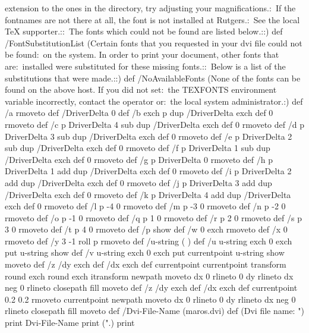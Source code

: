 extension to the ones in the directory, try adjusting your magnifications.:\
If the fontnames are not there at all, the font is not installed at Rutgers.:\
See the local TeX supporter.::\
The fonts which could not be found are listed below.::) def
/FontSubstitutionList (Certain fonts that you requested in your dvi file could not be found:\
on the system. In order to print your document, other fonts that are:\
installed were substituted for these missing fonts.::\
Below is a list of the substitutions that were made.::) def
/NoAvailableFonts (None of the fonts can be found on the above host. If you did not set:\
the TEXFONTS environment variable incorrectly, contact the operator or:\
the local system administrator.:) def
/a { rmoveto } def
/DriverDelta 0 def
/b { exch p dup /DriverDelta exch def 0 rmoveto } def
/c { p DriverDelta 4 sub dup /DriverDelta exch def 0 rmoveto } def
/d { p DriverDelta 3 sub dup /DriverDelta exch def 0 rmoveto } def
/e { p DriverDelta 2 sub dup /DriverDelta exch def 0 rmoveto } def
/f { p DriverDelta 1 sub dup /DriverDelta exch def 0 rmoveto } def
/g { p DriverDelta 0 rmoveto } def
/h { p DriverDelta 1 add dup /DriverDelta exch def 0 rmoveto } def
/i { p DriverDelta 2 add dup /DriverDelta exch def 0 rmoveto } def
/j { p DriverDelta 3 add dup /DriverDelta exch def 0 rmoveto } def
/k { p DriverDelta 4 add dup /DriverDelta exch def 0 rmoveto } def
/l { p -4 0 rmoveto } def
/m { p -3 0 rmoveto } def
/n { p -2 0 rmoveto } def
/o { p -1 0 rmoveto } def
/q { p 1 0 rmoveto } def
/r { p 2 0 rmoveto } def
/s { p 3 0 rmoveto } def
/t { p 4 0 rmoveto } def
/p { show } def
/w { 0 exch rmoveto } def
/x { 0 rmoveto } def
/y { 3 -1 roll p rmoveto } def
/u-string ( ) def
/u { u-string exch 0 exch put
u-string show
} def
/v { u-string exch 0 exch put
currentpoint
u-string show
moveto
} def
/z
{   /dy exch def
/dx exch def
currentpoint
currentpoint
transform round exch round exch itransform
newpath
moveto
dx 0 rlineto
0 dy rlineto
dx neg 0 rlineto
closepath
fill
moveto
}
def
/z
{   /dy exch def
/dx exch def
currentpoint
0.2 0.2 rmoveto
currentpoint
newpath
moveto
dx 0 rlineto
0 dy rlineto
dx neg 0 rlineto
closepath
fill
moveto
}
def
/Dvi-File-Name (maros.dvi) def
(Dvi file name: ") print Dvi-File-Name print (".\n) print
